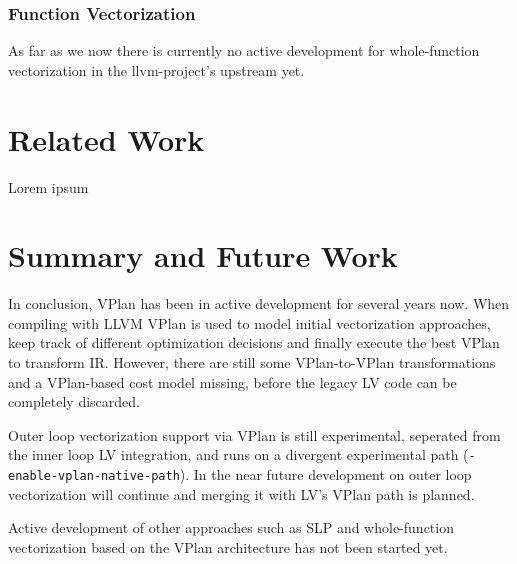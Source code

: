 \documentclass[sigplan,11pt,nonacm]{acmart}
\begin{document}
\subsubsection{Function Vectorization}
As far as we now there is currently no active development for whole-function vectorization in the
llvm-project's upstream yet.




\section{Related Work}
\label{sec:relatedwork}
Lorem ipsum




\section{Summary and Future Work}
\label{sec:summary}
In conclusion, VPlan has been in active development for several years now. When compiling with
LLVM VPlan is used to model initial vectorization approaches, keep track of different
optimization decisions and finally execute the best VPlan to transform IR. 
However, there are still some VPlan-to-VPlan transformations and a VPlan-based cost model missing, 
before the legacy LV code can be completely discarded.

Outer loop vectorization support via VPlan is still experimental, seperated from the inner loop
LV integration, and runs on a divergent experimental path (\texttt{-enable-\allowbreak vplan-\allowbreak native-\allowbreak path}).
In the near future development on outer loop vectorization will continue and merging it with LV's
VPlan path is planned.

Active development of other approaches such as SLP and whole-function vectorization based on the 
VPlan architecture has not been started yet.

\end{document}

